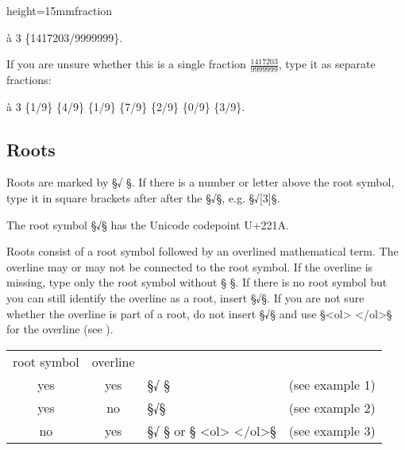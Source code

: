 \begin{sampleImageSmall}{height=15mm}{fraction}

\begin{typeMath}
à 3 \{1417203/9999999\}.
\end{typeMath}

If you are unsure whether this is a single fraction $\frac{1417203}{9999999}$, type it as separate fractions:

\begin{typeMath}
à 3 \{1/9\} \{4/9\} \{1/9\} \{7/9\} \{2/9\} \{0/9\} \{3/9\}.
\end{typeMath}

\end{sampleImageSmall}


\tocspace
\subsection{Roots}
\label{section roots}

\begin{mainrule}
Roots are marked by §√{ }§. If there is a number or letter above the root symbol, type it in square brackets after after the §√§, e.g. §√[3]§.
\end{mainrule}

\begin{clarification}
The root symbol §√§ has the Unicode codepoint U+221A.
\end{clarification}

\begin{clarification}
Roots consist of a root symbol followed by an overlined mathematical term. The overline may or may not be connected to the root symbol.
If the overline is missing, type only the root symbol without §{ }§.
If there is no root symbol but you can still identify the overline as a root, insert §√§. If you are not sure whether the overline is part of a root, do not insert §√§ and use §<ol> </ol>§ for the overline (see ).
\end{clarification}

\vspace{3mm}
\begin{tabelle}

\vspace{-1mm}
\begin{tabular}{@{}cc@{\qquad}l@{\qquad}l}
root symbol & overline & & \\[2mm]
yes & yes & §√{ }§ & (see example 1) \\[1mm]
yes & no & §√§ & (see example 2) \\[1mm]
no & yes & §√{ }§ or § <ol> </ol>§ & (see example 3) \\
\end{tabular}
\end{tabelle}

